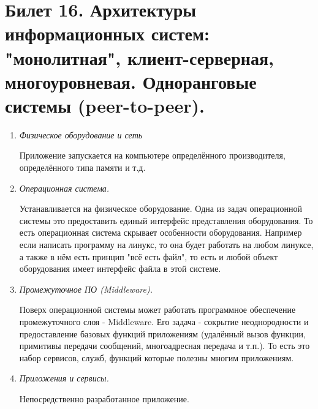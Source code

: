 \newpage
\section{Билет 16. Архитектуры информационных систем: "монолитная", клиент-серверная, многоуровневая. Одноранговые системы (peer-to-peer).}

\begin{enumerate}
\item \textit{Физическое оборудование и сеть}

Приложение запускается на компьютере определённого производителя, определённого типа памяти и т.д.

\item \textit{Операционная система.}

Устанавливается на физическое оборудование. Одна из задач операционной системы это предоставить единый интерфейс представления оборудования. То есть операционная система скрывает особенности оборудования. Например если написать программу на линукс, то она будет работать на любом линуксе, а также в нём есть принцип "всё есть файл", то есть и любой объект оборудования имеет интерфейс файла в этой системе. 

\item \textit{Промежуточное ПО (Middleware).}

Поверх операционной системы может работать программное обеспечение промежуточного слоя - Middleware.
Его задача - сокрытие неоднородности и предоставление базовых функций приложениям (удалённый вызов функции, примитивы передачи сообщений, многоадресная передача и т.п.).
То есть это набор сервисов, служб, функций которые полезны многим приложениям.

\item \textit{Приложения и сервисы.}

Непосредственно разработанное приложение.
\end{enumerate}

